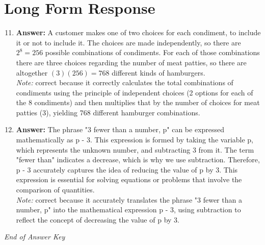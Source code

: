 \documentclass[12pt]{article}
\begin{document}
\section*{Long Form Response}
\begin{enumerate}[label=\arabic*.]
\setcounter{enumi}{10}
\item \textbf{Answer:} A customer makes one of two choices for each condiment, to include it or not to include it. The choices are made independently, so there are $2^8 = 256$ possible combinations of condiments. For each of those combinations there are three choices regarding the number of meat patties, so there are altogether $(3)(256)=\boxed{768}$ different kinds of hamburgers.
\\ \textit{Note:} correct because it correctly calculates the total combinations of condiments using the principle of independent choices (2 options for each of the 8 condiments) and then multiplies that by the number of choices for meat patties (3), yielding 768 different hamburger combinations.
\item \textbf{Answer:} The phrase "3 fewer than a number, p" can be expressed mathematically as p - 3. This expression is formed by taking the variable p, which represents the unknown number, and subtracting 3 from it. The term "fewer than" indicates a decrease, which is why we use subtraction. Therefore, p - 3 accurately captures the idea of reducing the value of p by 3. This expression is essential for solving equations or problems that involve the comparison of quantities.
\\ \textit{Note:} correct because it accurately translates the phrase "3 fewer than a number, p" into the mathematical expression p - 3, using subtraction to reflect the concept of decreasing the value of p by 3.
\end{enumerate}

\vfill
\noindent\textit{End of Answer Key}
\end{document}

